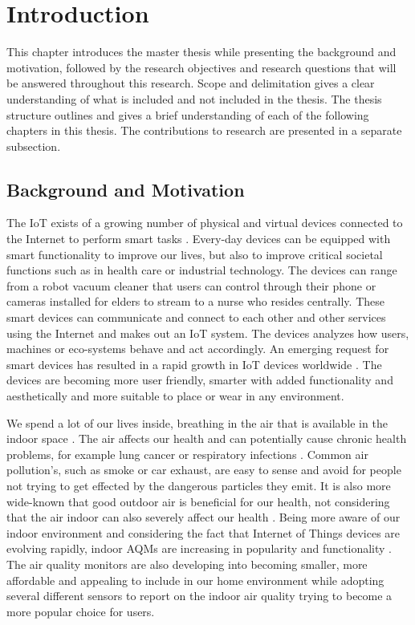 \chapter{Introduction}
This chapter introduces the master thesis while presenting the background and motivation, followed by the research objectives and research questions that will be answered throughout this research. Scope and delimitation gives a clear understanding of what is included and not included in the thesis. The thesis structure outlines and gives a brief understanding of each of the following chapters in this thesis. The contributions to research are presented in a separate subsection. 

\section{Background and Motivation}
The \gls{IoT} exists of a growing number of physical and virtual devices connected to the Internet to perform smart tasks \cite{IoTSurveyAl-Fuqaha}. Every-day devices can be equipped with smart functionality to improve our lives, but also to improve critical societal functions such as in health care or industrial technology. The devices can range from a robot vacuum cleaner that users can control through their phone or cameras installed for elders to stream to a nurse who resides centrally. These smart devices can communicate and connect to each other and other services using the Internet and makes out an \gls{IoT} system. The devices analyzes how users, machines or eco-systems behave and act accordingly. An emerging request for smart devices has resulted in a rapid growth in \gls{IoT} devices worldwide \cite{IoTAndPrivacy}. The devices are becoming more user friendly, smarter with added functionality and aesthetically and more suitable to place or wear in any environment. 

We spend a lot of our lives inside, breathing in the air that is available in the indoor space \cite{IndoorAirQualityMonitorIoT}. The air affects our health and can potentially cause chronic health problems, for example lung cancer or respiratory infections \cite{IAQMonitorReview}. Common air pollution's, such as smoke or car exhaust, are easy to sense and avoid for people not trying to get effected by the dangerous particles they emit. It is also more wide-known that good outdoor air is beneficial for our health, not considering that the air indoor can also severely affect our health \cite{IndoorAirQuality}. Being more aware of our indoor environment and considering the fact that Internet of Things devices are evolving rapidly, indoor \gls{AQM}s are increasing in popularity and functionality \cite{SecurityAndDataIntInAQM}. The air quality monitors are also developing into becoming smaller, more affordable and appealing to include in our home environment while adopting several different sensors to report on the indoor air quality trying to become a more popular choice for users. 

